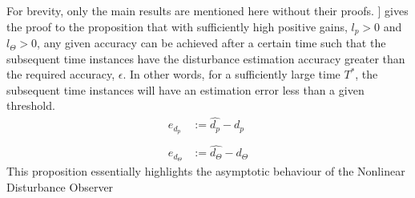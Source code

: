 \documentclass[letterpaper%
, twoside%
, 12pt%
,memoire%
, english%
,creativecommons,hyperref%
]{thETS}
\theoremstyle{newThmStyle}
\begin{document}
For brevity, only the main results are mentioned here without their proofs. \citep{RN114}] gives the proof to the proposition that with sufficiently high positive gains, $l_p>0$ and $l_\Theta>0$, any given accuracy can be achieved after a certain time such that the subsequent time instances have the disturbance estimation accuracy greater than the required accuracy, $\epsilon$. In other words, for a sufficiently large time $T^*$, the subsequent time instances will have an estimation error less than a given threshold.
\begin{align} \label{eqn:NDO3}
e_{d_p} &:=\hat{d_p} - d_p \\ \nonumber\\
e_{d_\Theta} &:=\hat{d_\Theta}-d_\Theta
\end{align}
This proposition essentially highlights the asymptotic behaviour of the Nonlinear Disturbance Observer
\end{document}
